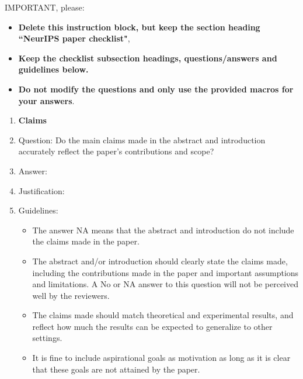 IMPORTANT, please:
\begin{itemize}
\item {\bf Delete this instruction block, but keep the section heading ``NeurIPS paper checklist"},
\item  {\bf Keep the checklist subsection headings, questions/answers and guidelines below.}
\item {\bf Do not modify the questions and only use the provided macros for your answers}.
\end{itemize}




\begin{enumerate}

\item {\bf Claims}
\item[] Question: Do the main claims made in the abstract and introduction accurately reflect the paper's contributions and scope?
\item[] Answer: \answerYes{} %
\item[] Justification: \justificationTODO{}
\item[] Guidelines:
  \begin{itemize}
  \item The answer NA means that the abstract and introduction do not include the claims made in the paper.
  \item The abstract and/or introduction should clearly state the claims made, including the contributions made in the paper and important assumptions and limitations. A No or NA answer to this question will not be perceived well by the reviewers.
  \item The claims made should match theoretical and experimental results, and reflect how much the results can be expected to generalize to other settings.
  \item It is fine to include aspirational goals as motivation as long as it is clear that these goals are not attained by the paper.
  \end{itemize}


\end{enumerate}
